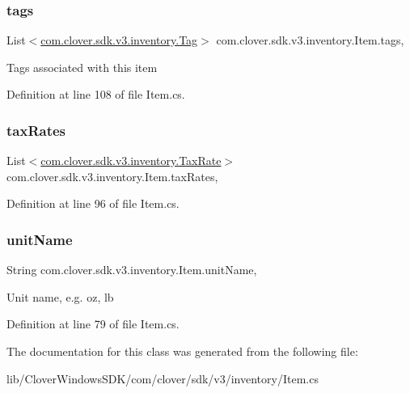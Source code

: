 \subsubsection{\texorpdfstring{tags}{tags}}
{\footnotesize\ttfamily List$<$\hyperlink{classcom_1_1clover_1_1sdk_1_1v3_1_1inventory_1_1_tag}{com.\+clover.\+sdk.\+v3.\+inventory.\+Tag}$>$ com.\+clover.\+sdk.\+v3.\+inventory.\+Item.\+tags\hspace{0.3cm}{\ttfamily [get]}, {\ttfamily [set]}}



Tags associated with this item 



Definition at line 108 of file Item.\+cs.

\mbox{\label{classcom_1_1clover_1_1sdk_1_1v3_1_1inventory_1_1_item_a22ded520de11eba7869f8b7964235c1d}} 
\subsubsection{\texorpdfstring{tax\+Rates}{taxRates}}
{\footnotesize\ttfamily List$<$\hyperlink{classcom_1_1clover_1_1sdk_1_1v3_1_1inventory_1_1_tax_rate}{com.\+clover.\+sdk.\+v3.\+inventory.\+Tax\+Rate}$>$ com.\+clover.\+sdk.\+v3.\+inventory.\+Item.\+tax\+Rates\hspace{0.3cm}{\ttfamily [get]}, {\ttfamily [set]}}



Definition at line 96 of file Item.\+cs.

\mbox{\label{classcom_1_1clover_1_1sdk_1_1v3_1_1inventory_1_1_item_a3831c28627732a1c99f5c3ecfe8ada43}} 
\subsubsection{\texorpdfstring{unit\+Name}{unitName}}
{\footnotesize\ttfamily String com.\+clover.\+sdk.\+v3.\+inventory.\+Item.\+unit\+Name\hspace{0.3cm}{\ttfamily [get]}, {\ttfamily [set]}}



Unit name, e.\+g. oz, lb 



Definition at line 79 of file Item.\+cs.



The documentation for this class was generated from the following file\+:\begin{DoxyCompactItemize}
\item 
lib/\+Clover\+Windows\+S\+D\+K/com/clover/sdk/v3/inventory/Item.\+cs\end{DoxyCompactItemize}
